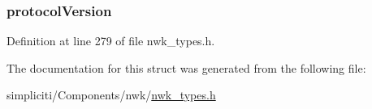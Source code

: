 \hypertarget{structsmplVersionInfo__t_a69ba4ce44c8b3df5af22db880cdb9c20}{
\subsubsection[{protocol\-Version}]{ {\bf protocol\-Version}}}\label{structsmplVersionInfo__t_a69ba4ce44c8b3df5af22db880cdb9c20}


\-Definition at line 279 of file nwk\-\_\-types.\-h.



\-The documentation for this struct was generated from the following file\-:\begin{DoxyCompactItemize}
\item 
simpliciti/\-Components/nwk/\hyperlink{nwk__types_8h}{nwk\-\_\-types.\-h}\end{DoxyCompactItemize}
